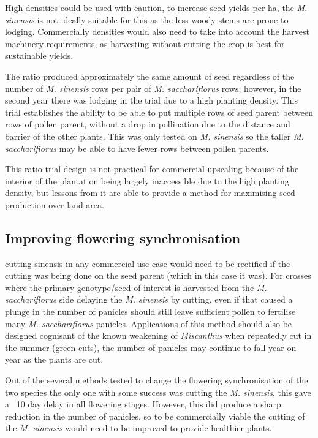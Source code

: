 \documentclass[fleqn, 15pt, lineno]{olplainarticle}
\begin{document}
High densities could be used with caution, to increase seed yields per ha, the \textit{M. sinensis} is not ideally suitable for this as the less woody stems are prone to lodging.
Commercially densities would also need to take into account the harvest machinery requirements, as harvesting without cutting the crop is best for sustainable yields.

The ratio produced approximately the same amount of seed regardless of the number of \textit{M. sinensis} rows per pair of \textit{M. sacchariflorus} rows; however, in the second year there was lodging in the trial due to a high planting density.
This trial establishes the ability to be able to put multiple rows of seed parent between rows of pollen parent, without a drop in pollination due to the distance and barrier of the other plants.
This was only tested on \textit{M. sinensis} so the taller \textit{M. sacchariflorus} may be able to have fewer rows between pollen parents.

This ratio trial design is not practical for commercial upscaling because of the interior of the plantation being largely inaccessible due to the high planting density, but lessons from it are able to provide a method for maximising seed production over land area.

\subsection{Improving flowering synchronisation}

cutting sinensis in any commercial use-case would need to be rectified if the cutting was being done on the seed parent (which in this case it was).
For crosses where the primary genotype/seed of interest is harvested from the \textit{M. sacchariflorus} side delaying the \textit{M. sinensis} by cutting, even if that caused a plunge in the number of panicles should still leave sufficient pollen to fertilise many \textit{M. sacchariflorus} panicles.
Applications of this method should also be designed cognisant of the known weakening of \textit{Miscanthus} when repeatedly cut in the summer (green-cuts), the number of panicles may continue to fall year on year as the plants are cut.

Out of the several methods tested to change the flowering synchronisation of the two species the only one with some success was cutting the \textit{M. sinensis}, this gave a ~10 day delay in all flowering stages.
However, this did produce a sharp reduction in the number of panicles, so to be commercially viable the cutting of the \textit{M. sinensis} would need to be improved to provide healthier plants.
\end{document}
